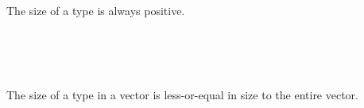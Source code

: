 The size of a type is always positive.

\begin{fence}
\begin{code}%
\>[0]\AgdaSpace{}%
\AgdaSymbol{:}\AgdaSpace{}%
\AgdaSpace{}%
\AgdaSymbol{\{}\AgdaSymbol{\}}\AgdaSpace{}%
\AgdaSpace{}%
\AgdaSpace{}%
\AgdaOperator{\AgdaFunction{<}}\AgdaSpace{}%
\AgdaSpace{}%
\<%
\\
\>[0]\AgdaSpace{}%
\AgdaSymbol{\{}\AgdaSpace{}%
\AgdaSpace{}%
\AgdaSymbol{\}}\AgdaSpace{}%
\AgdaSymbol{=}\AgdaSpace{}%
\AgdaSpace{}%
\<%
\\
\>[0]\AgdaSpace{}%
\AgdaSymbol{\{}\AgdaSymbol{\}}\AgdaSpace{}%
\AgdaSymbol{=}\AgdaSpace{}%
\AgdaSpace{}%
\<%
\\
\>[0]\AgdaSpace{}%
\AgdaSymbol{\{}\AgdaSpace{}%
\AgdaSpace{}%
\AgdaSpace{}%
\AgdaSpace{}%
\AgdaSpace{}%
\AgdaSymbol{\}}\AgdaSpace{}%
\AgdaSymbol{=}\AgdaSpace{}%
\AgdaSpace{}%
\<%
\end{code}
\end{fence}

The size of a type in a vector is less-or-equal in size to the entire
vector.

